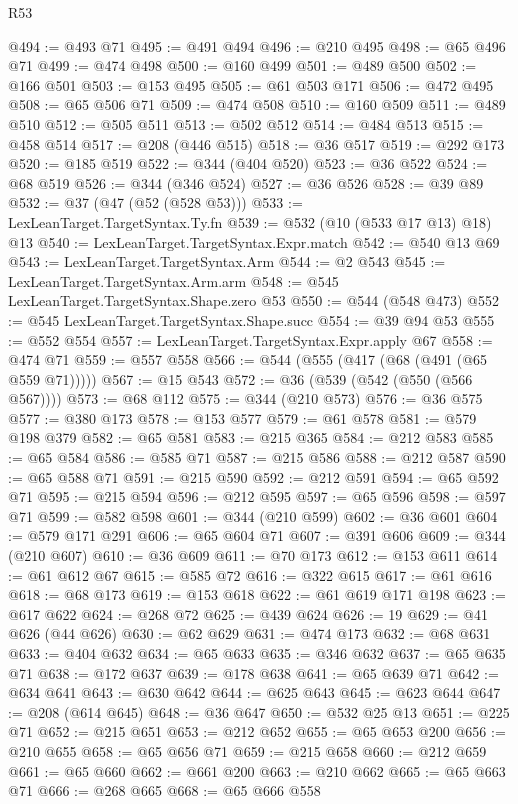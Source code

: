 \begin{lexlean}{R53}
\begin{coremodule}
@494 := @493 @71
@495 := @491 @494
@496 := @210 @495
@498 := @65 @496 @71
@499 := @474 @498
@500 := @160 @499
@501 := @489 @500
@502 := @166 @501
@503 := @153 @495
@505 := @61 @503 @171
@506 := @472 @495
@508 := @65 @506 @71
@509 := @474 @508
@510 := @160 @509
@511 := @489 @510
@512 := @505 @511
@513 := @502 @512
@514 := @484 @513
@515 := @458 @514
@517 := @208 (@446 @515)
@518 := @36 @517
@519 := @292 @173
@520 := @185 @519
@522 := @344 (@404 @520)
@523 := @36 @522
@524 := @68 @519
@526 := @344 (@346 @524)
@527 := @36 @526
@528 := @39 @89
@532 := @37 (@47 (@52 (@528 @53)))
@533 := LexLeanTarget.TargetSyntax.Ty.fn
@539 := @532 (@10 (@533 @17 @13) @18) @13
@540 := LexLeanTarget.TargetSyntax.Expr.match
@542 := @540 @13 @69
@543 := LexLeanTarget.TargetSyntax.Arm
@544 := @2 @543
@545 := LexLeanTarget.TargetSyntax.Arm.arm
@548 := @545 LexLeanTarget.TargetSyntax.Shape.zero @53
@550 := @544 (@548 @473)
@552 := @545 LexLeanTarget.TargetSyntax.Shape.succ
@554 := @39 @94 @53
@555 := @552 @554
@557 := LexLeanTarget.TargetSyntax.Expr.apply @67
@558 := @474 @71
@559 := @557 @558
@566 := @544 (@555 (@417 (@68 (@491 (@65 @559 @71)))))
@567 := @15 @543
@572 := @36 (@539 (@542 (@550 (@566 @567))))
@573 := @68 @112
@575 := @344 (@210 @573)
@576 := @36 @575
@577 := @380 @173
@578 := @153 @577
@579 := @61 @578
@581 := @579 @198 @379
@582 := @65 @581
@583 := @215 @365
@584 := @212 @583
@585 := @65 @584
@586 := @585 @71
@587 := @215 @586
@588 := @212 @587
@590 := @65 @588 @71
@591 := @215 @590
@592 := @212 @591
@594 := @65 @592 @71
@595 := @215 @594
@596 := @212 @595
@597 := @65 @596
@598 := @597 @71
@599 := @582 @598
@601 := @344 (@210 @599)
@602 := @36 @601
@604 := @579 @171 @291
@606 := @65 @604 @71
@607 := @391 @606
@609 := @344 (@210 @607)
@610 := @36 @609
@611 := @70 @173
@612 := @153 @611
@614 := @61 @612 @67
@615 := @585 @72
@616 := @322 @615
@617 := @61 @616
@618 := @68 @173
@619 := @153 @618
@622 := @61 @619 @171 @198
@623 := @617 @622
@624 := @268 @72
@625 := @439 @624
@626 := 19
@629 := @41 @626 (@44 @626)
@630 := @62 @629
@631 := @474 @173
@632 := @68 @631
@633 := @404 @632
@634 := @65 @633
@635 := @346 @632
@637 := @65 @635 @71
@638 := @172 @637
@639 := @178 @638
@641 := @65 @639 @71
@642 := @634 @641
@643 := @630 @642
@644 := @625 @643
@645 := @623 @644
@647 := @208 (@614 @645)
@648 := @36 @647
@650 := @532 @25 @13
@651 := @225 @71
@652 := @215 @651
@653 := @212 @652
@655 := @65 @653 @200
@656 := @210 @655
@658 := @65 @656 @71
@659 := @215 @658
@660 := @212 @659
@661 := @65 @660
@662 := @661 @200
@663 := @210 @662
@665 := @65 @663 @71
@666 := @268 @665
@668 := @65 @666 @558

\end{coremodule}
\end{lexlean}
